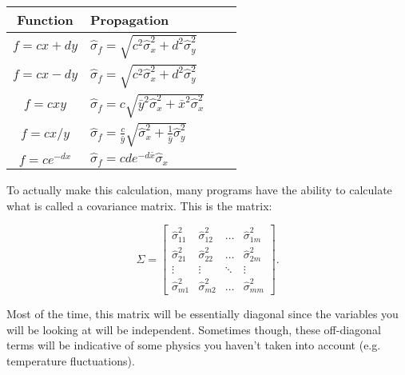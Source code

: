 \begin{table}
 \centering
\begin{tabularx}{250pt}{|c|X|c|X|}
  \hline 
    Function & Propagation \\ \hline    \hline
    $f = cx + dy$ 	& 	$\hat \sigma_f = \sqrt{c^2 \hat \sigma_x^2 +d^2 \hat \sigma_y^2}$    	\vspace{2 mm}\\ \hline
    $f = cx - dy$ 	& 	$\hat \sigma_f = \sqrt{c^2 \hat \sigma_x^2 +d^2 \hat \sigma_y^2}$ 	\vspace{2 mm}\\ \hline
    $f = cxy $			&  $\hat \sigma_f = c\sqrt{\bar y^2\hat  \sigma_x^2+\bar x^2 \hat \sigma_x^2}$		\vspace{2 mm}\\ \hline
    $f = cx/y $		&  $\hat \sigma_f = \frac{c}{\bar y}\sqrt{\hat \sigma_x^2 + \frac{1}{\bar y}\hat \sigma_y^2}$	\vspace{2 mm}	\\ \hline 
    $f = ce^{-dx}$ &  $\hat \sigma_f = cde^{-d\bar x}\hat \sigma_x$	\vspace{2 mm}	\\ \hline
\end{tabularx}
\end{table}


To actually make this calculation, many programs have the ability to calculate what is called a covariance matrix. This is the matrix:

\[ \Sigma = \left[ \begin{array}{cccc}
\hat \sigma_{11}^2 & \hat \sigma_{12}^2 & \ldots & \hat \sigma_{1m}^2 \\
\hat \sigma_{21}^2 & \hat \sigma_{22}^2 & \ldots & \hat \sigma_{2m}^2 \\
\vdots & \vdots & \ddots & \vdots \\
\hat \sigma_{m1}^2 & \hat \sigma_{m2}^2 & \ldots & \hat \sigma_{mm}^2 \end{array} \right].\]

Most of the time, this matrix will be essentially diagonal since the variables you will be looking at will be independent. Sometimes though, these off-diagonal terms will be indicative of some physics you haven't taken into account (e.g. temperature fluctuations).

